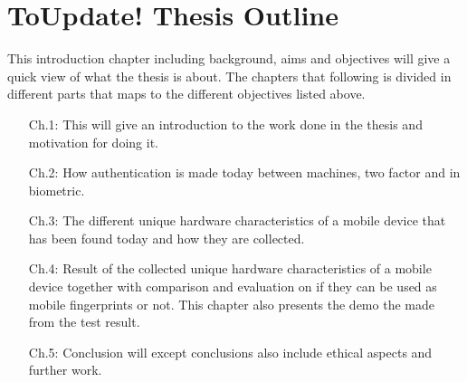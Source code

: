 \section{\textbf{ToUpdate! }Thesis Outline}\label{sec:outline}
This introduction chapter including background, aims and objectives will give a quick view of what the thesis is about. The chapters that following is divided in different parts that maps to the different objectives listed above.
\begin{itemize}
	\item[Ch.1: ]	This will give an introduction to the work done in the thesis and motivation for doing it.
	\item[Ch.2: ]	How authentication is made today between machines, two factor and in biometric.
	\item[Ch.3: ]	The different unique hardware characteristics of a mobile device that has been found today and how they are collected.
	\item[Ch.4: ]	Result of the collected unique hardware characteristics of a mobile device together with comparison and evaluation on if they can be used as mobile fingerprints or not. This chapter also presents the demo the made from the test result.
	\item[Ch.5: ]	Conclusion will except conclusions also include ethical aspects and further work. 
\end{itemize}